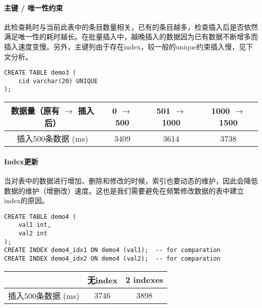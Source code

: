\paragraph{主键 / 唯一性约束} 此检查耗时与当前此表中的条目数量相关，已有的条目越多，检查插入后是否依然满足唯一性的耗时越长。在批量插入中，越晚插入的数据因为已有数据不断增多而插入速度变慢。另外，主键列由于存在index，较一般的unique约束插入慢，见下文分析。
\begin{lstlisting}
CREATE TABLE demo3 (
    cid varchar(20) UNIQUE
);
\end{lstlisting}
\vspace{-2.3em}
\begin{table}[!h]
\centering
\begin{tabular}{|c|c|c|c|}
\hline
数据量（原有 $\to$ 插入后）        & 0 $\to$ 500 & 501 $\to$ 1000 & 1000 $\to$ 1500 \\ \hline
插入500条数据 (ms) & 3409        & 3614           & 3738            \\ \hline
\end{tabular}
\end{table}

\paragraph{Index更新}
当对表中的数据进行增加、删除和修改的时候，索引也要动态的维护，因此会降低数据的维护（增删改）速度。这也是我们需要避免在频繁修改数据的表中建立index的原因。
\begin{lstlisting}
CREATE TABLE demo4 (
    val1 int,
    val2 int
);
CREATE INDEX demo4_idx1 ON demo4 (val1);  -- for comparation
CREATE INDEX demo4_idx2 ON demo4 (val2);  -- for comparation
\end{lstlisting}
\vspace{-2.3em}
\begin{table}[!h]
\centering
\begin{tabular}{|c|c|c|}
\hline
              & 无index & 2 indexes \\ \hline
插入500条数据 (ms) & 3746   & 3898      \\ \hline
\end{tabular}
\end{table}
